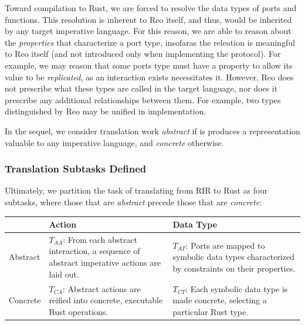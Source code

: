 Toward compilation to Rust, we are forced to resolve the data types of ports and functions. This resolution is inherent to Reo itself, and thus, would be inherited by any target imperative language. For this reason, we are able to reason about the \textit{properties} that characterize a port type, insofaras the releation is meaningful to Reo itself (and not introduced only when implementing the protocol). For example, we may reason that some ports type must have a property to allow its value to be \textit{replicated}, as an interaction exists necessitates it. However, Reo does not prescribe what these types are called in the target language, nor does it prescribe any additional relationships between them. For example, two types distinguished by Reo may be unified in implementation. 

In the sequel, we consider translation work \textit{abstract} if is produces a representation valuable to any imperative language, and \textit{concrete} otherwise.


\subsubsection{Translation Subtasks Defined}

Ultimately, we partition the task of translating from RIR to Rust as four subtasks, where those that are \textit{abstract} precede those that are \textit{concrete}:

\begin{tabular}{l|p{5cm}p{5cm}}
	& Action & Data Type \\
	\hline
	Abstract & $T_{AA}$: From each abstract interaction, a sequence of abstract imperative actions are laid out. & $T_{AT}$: Ports are mapped to symbolic data types characterized by constraints on their properties. \\
	\hline
	Concrete & $T_{CA}$: Abstract actions are reified into concrete, executable Rust operations. & $T_{CT}$: Each symbolic data type is made concrete, selecting a particular Rust type.
\end{tabular}


%
%
%

